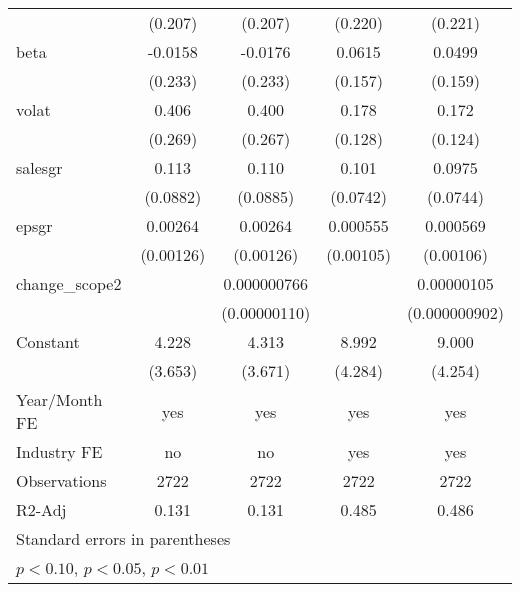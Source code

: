 \begin{table}[htbp]
\begin{tabular}{l*{4}{c}}
                    &     (0.207)         &     (0.207)         &     (0.220)         &     (0.221)         \\
[1em]
beta                &     -0.0158         &     -0.0176         &      0.0615         &      0.0499         \\
                    &     (0.233)         &     (0.233)         &     (0.157)         &     (0.159)         \\
[1em]
volat               &       0.406         &       0.400         &       0.178         &       0.172         \\
                    &     (0.269)         &     (0.267)         &     (0.128)         &     (0.124)         \\
[1em]
salesgr             &       0.113         &       0.110         &       0.101         &      0.0975         \\
                    &    (0.0882)         &    (0.0885)         &    (0.0742)         &    (0.0744)         \\
[1em]
epsgr               &     0.00264\sym{**} &     0.00264\sym{**} &    0.000555         &    0.000569         \\
                    &   (0.00126)         &   (0.00126)         &   (0.00105)         &   (0.00106)         \\
[1em]
change\_scope2       &                     & 0.000000766         &                     &  0.00000105         \\
                    &                     &(0.00000110)         &                     &(0.000000902)         \\
[1em]
Constant            &       4.228         &       4.313         &       8.992\sym{**} &       9.000\sym{**} \\
                    &     (3.653)         &     (3.671)         &     (4.284)         &     (4.254)         \\
\hline
Year/Month FE       &         yes         &         yes         &         yes         &         yes         \\
Industry FE         &          no         &          no         &         yes         &         yes         \\
Observations        &        2722         &        2722         &        2722         &        2722         \\
R2-Adj              &       0.131         &       0.131         &       0.485         &       0.486         \\
\hline\hline
\multicolumn{5}{l}{\footnotesize Standard errors in parentheses}\\
\multicolumn{5}{l}{\footnotesize \sym{*} \(p<0.10\), \sym{**} \(p<0.05\), \sym{***} \(p<0.01\)}\\
\end{tabular}
\end{table}
